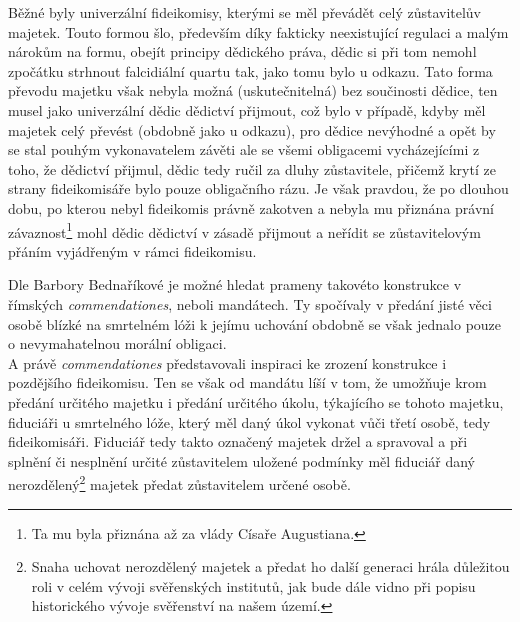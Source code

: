 \documentclass{article}
\begin{document}
Běžné byly univerzální fideikomisy, kterými se měl převádět celý zůstavitelův majetek. Touto formou šlo, především díky fakticky neexistující regulaci a malým nárokům na formu, obejít principy dědického práva, dědic si při tom nemohl zpočátku strhnout falcidiální quartu tak, jako tomu bylo u odkazu. Tato forma převodu majetku však nebyla možná (uskutečnitelná) bez součinosti dědice, ten musel jako univerzální dědic dědictví přijmout, což bylo v případě, kdyby měl majetek celý převést (obdobně jako u odkazu), pro dědice nevýhodné a opět by se stal pouhým vykonavatelem závěti ale se všemi obligacemi vycháze\-jícími z toho, že dědictví přijmul, dědic tedy ručil za dluhy zůstavitele, přičemž krytí ze strany fideikomisáře bylo pouze obligačního rázu. Je však pravdou, že po dlouhou dobu, po kterou nebyl fideikomis právně zakotven a nebyla mu přiznána právní závaznost\footnote{Ta mu byla přiznána až za vlády Císaře Augustiana.} mohl dědic dědictví v zásadě přijmout a neřídit se zůstavitelovým přáním vyjádřeným v rámci fideikomisu.\\

\newpage

Dle Barbory Bednaříkové je možné hledat prameny takovéto konstrukce v římských \textit{commendationes}, neboli mandátech. Ty spočívaly v předání jisté věci osobě blízké na smrtelném lóži k jejímu uchování obdobně se však jednalo pouze o nevymahatelnou morální obligaci.\\


A právě \textit{commendationes} představovali inspiraci ke zrození konstrukce i pozdějšího fideikomisu. Ten se však od mandátu líší v tom, že umožňuje krom předání určitého majetku i předání určitého úkolu, týkajícího se tohoto majetku, fiduciáři u smrtelného lóže, který měl daný úkol vykonat vůči třetí osobě, tedy fideikomisáři. Fiduciář tedy takto označený majetek držel a spravoval a při splnění či nesplnění určité zůstavitelem uložené podmínky měl fiduciář daný nerozdělený\footnote{Snaha uchovat nerozdělený majetek a předat ho další generaci hrála důležitou roli v celém vývoji svěřenských institutů, jak bude dále vidno při popisu historického vývoje svěřenství na našem území.} majetek předat zůstavitelem určené osobě.\\
\end{document}
